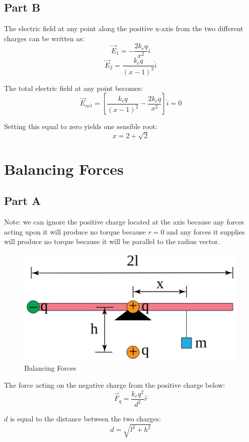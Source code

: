 \documentclass{article}
\begin{document}
\subsection*{Part B}

The electric field at any point along the positive x-axis from the two different
charges can be written as:
$$ \vec{E}_{1} = -\frac{ 2k_{e}q }{ x^{2} } \hat{i} $$
$$ \vec{E}_{2} = \frac{ k_{e}q }{ (x - 1)^{2} } \hat{i} $$

The total electric field at any point becomes:
$$ \vec{E}_{net} = \left[ \frac{ k_{e}q }{ (x - 1)^{2} } - \frac{ 2k_{e}q }{
x^{2} } \right] \hat{i} = 0$$

Setting this equal to zero yields one sensible root:
$$ x = 2 + \sqrt{2} $$

\section{Balancing Forces}

\subsection*{Part A}

Note: we can ignore the positive charge located at the axis because any forces
acting upon it will produce no torque because $r = 0$ and any forces it supplies
will produce no torque because it will be parallel to the radius vector.

\begin{figure}[H]
  \centering
  \includegraphics[scale=0.50]{"BalancingForces"}
  \caption{Balancing Forces}
\end{figure}

The force acting on the negative charge from the positive charge below:
$$ \vec{F}_{q} = \frac{ k_{e} q^{2} }{ d^{2} } \hat{r} $$

$d$ is equal to the distance between the two charges:
$$ d = \sqrt{l^{2} + h^{2}} $$
\end{document}
